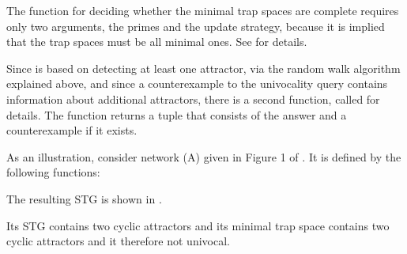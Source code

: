 \documentclass[letterpaper,10pt,english]{sphinxmanual}
\begin{document}
The function for deciding whether the minimal trap spaces are complete requires only two arguments, the primes and the update strategy,
because it is implied that the trap spaces must be all minimal ones.
See {\hyperref[\detokenize{Attractors:completeness}]{}} for details.

\begin{sphinxVerbatim}[commandchars=\\\{\}]
 
\end{sphinxVerbatim}

Since {\hyperref[\detokenize{Attractors:univocality}]{}} is based on detecting at least one attractor, via the random walk algorithm explained above,
and since a counterexample to the univocality query contains information about additional attractors,
there is a second function, called  for details.
The function {\hyperref[\detokenize{Attractors:faithfulness-with-counterexample}]{}} returns a tuple that consists of the answer and a counterexample if it exists.

As an illustration, consider network (A) given in Figure 1 of {\hyperref[\detokenize{Bibliography:klarner2015trap}]{}}.
It is defined by the following functions:

The resulting STG is shown in {\hyperref[\detokenize{Manual:figure28}]{}}.

Its STG contains two cyclic attractors and its minimal trap space \sphinxcode{-{-}-} contains two cyclic attractors and it therefore not univocal.
\end{document}
